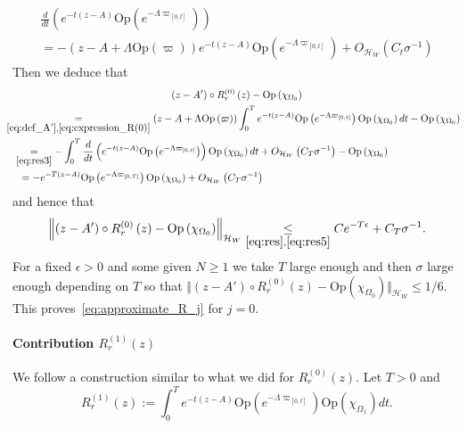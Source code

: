 \documentclass[10pt]{amsart}
\theoremstyle{definition}\newtheorem{defi}[theo]{Definition}\newtheorem{rema}[theo]{Remark}\newtheorem{exam}[theo]{Example}\newtheorem{exem}[theo]{Example}\newtheorem{nota}[theo]{Notation}
\newcommand{\clH}{\mathcal{H}}
\newcommand{\Opp}{\mathrm{Op}}
\begin{document}
\begin{multline}\label{eq:res3}
\frac{d}{dt}\left(e^{-t\left(z-A\right)}\Opp \left(e^{-\Lambda\varpi_{\left[0,t\right]}}\right)\right)\\
= -\left(z-A+\Lambda\Opp \left(\varpi\right)\right)e^{-t\left(z-A\right)}\Opp \left(e^{-\Lambda\varpi_{\left[0,t\right]}}\right)
+O_{\clH _{W}}\left(C_{t}\sigma^{-1}\right)
\end{multline}
Then we deduce that
\begin{multline}\label{eq:res}
\left(z-A'\right)\circ R_{r}^{\left(0\right)}\left(z\right)-\Opp \left(\chi_{\Omega_{0}}\right)\\
\begin{aligned}
&\mkern-17mu\underset{\eqref{eq:def_A'},\eqref{eq:expression_R(0)}}{=}\left(z-A+\Lambda\Opp \left(\varpi\right)\right)\int_{0}^{T}e^{-t\left(z-A\right)}\Opp \left(e^{-\Lambda\varpi_{\left[0,t\right]}}\right)\Opp \left(\chi_{\Omega_{0}}\right)dt-\Opp \left(\chi_{\Omega_{0}}\right)\\
& \underset{\eqref{eq:res3}}{=}-\int_{0}^{T}\frac{d}{dt}\left(e^{-t\left(z-A\right)}\Opp \left(e^{-\Lambda\varpi_{\left[0,t\right]}}\right)\right)\Opp \left(\chi_{\Omega_{0}}\right)dt+O_{\clH _{W}}\left(C_{T}\sigma^{-1}\right)-\Opp \left(\chi_{\Omega_{0}}\right)\\
& \mkern10mu =-e^{-T\left(z-A\right)}\Opp \left(e^{-\Lambda\varpi_{\left[0,T\right]}}\right)\Opp \left(\chi_{\Omega_{0}}\right)+O_{\clH _{W}}\left(C_{T}\sigma^{-1}\right)
\end{aligned}
\end{multline}
and hence that
\[
\left\Vert \left(z-A'\right)\circ R_{r}^{\left(0\right)}\left(z\right)-\Opp \left(\chi_{\Omega_{0}}\right)\right\Vert _{\clH _{W}}\underset{\eqref{eq:res},\eqref{eq:res5}}{\leq}Ce^{-T\epsilon}+C_{T}\sigma^{-1}.
\]
For a fixed $\epsilon>0$ and some given $N\geq1$ we take $T$ large enough and then $\sigma$ large enough depending on $T$ so that $\Vert (z-A')\circ R_{r}^{(0)}(z)-\Opp (\chi_{\Omega_{0}})\Vert _{\clH _{W}}\leq1/6$. This proves~\eqref{eq:approximate_R_j} for $j=0$.

\paragraph{Contribution $R_{r}^{(1)}(z)$}

We follow a construction similar to what we did for $R_{r}^{(0)}(z)$. Let $T>0$ and
\begin{equation}\label{eq:expression_R(1)}
R_{r}^{\left(1\right)}\left(z\right):=\int_{0}^{T}e^{-t\left(z-A\right)}\Opp \left(e^{-\Lambda\varpi_{\left[0,t\right]}}\right)\Opp \left(\chi_{\Omega_{1}}\right)dt.
\end{equation}
\end{document}
